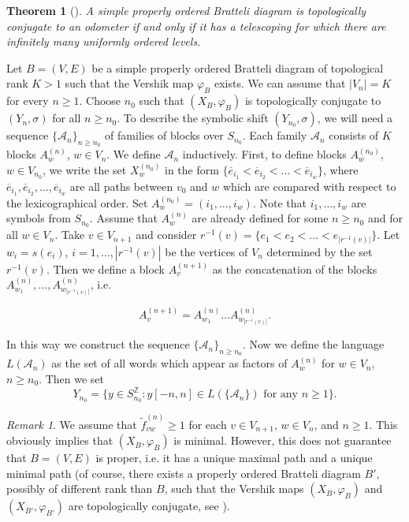 \documentclass[11pt, english, reqno]{amsart}
\theoremstyle{definition}
\theoremstyle{remark}
\newtheorem{remar}[defin]{Remark}
\theoremstyle{plain}
\newtheorem{thm}[defin]{Theorem}
\def\ov{\overline}
\def\tl{\widetilde}
\numberwithin{equation}{section}
\begin{document}
{\begin{thm}[\cite{FrickPetersenShields2017}]
A simple properly ordered Bratteli diagram is topologically conjugate to an
odometer if and only if it has a telescoping for which there are infinitely many
uniformly ordered levels.
\end{thm}

Let $B = (V,E)$ be a simple properly ordered Bratteli diagram of topological
rank $K > 1$ such that the Vershik map $\varphi_B$ exists. We can assume
that $|V_n| = K$ for every $n \geq 1$. Choose $n_0$ such that $(X_B,
\varphi_B)$ is topologically conjugate to $(Y_n, \sigma)$ for all $n \geq
n_0$. To describe the symbolic shift $(Y_{n_0}, \sigma)$, we will need a
sequence $\{\mathcal{A}_n\}_{n \geq n_0}$ of families of blocks over
$S_{n_0}$. Each family $\mathcal{A}_n$ consists of $K$ blocks
$A_w^{(n)}$, $w \in V_n$. We define $\mathcal{A}_n$ inductively. First, to
define blocks $A_w^{(n_0)}$, $w \in V_{n_0}$, we write the set
$X_w^{(n_0)}$ in the form $\{\ov e_{i_1} < \ov e_{i_2} < \ldots < \ov
e_{i_w}\}$, where $\ov e_{i_1}, \ov e_{i_2}, \ldots, \ov e_{i_w}$ are all
paths between $v_0$ and $w$ which are compared with respect to the
lexicographical order. Set $A_w^{(n_0)} = (i_1, \ldots, i_w)$. Note that
$i_1, \ldots, i_w$ are symbols from $S_{n_0}$. Assume that $A_w^{(n)}$
are already defined for some $n \geq n_0$ and for all $w \in V_n$. Take $v
\in V_{n+1}$ and consider $r^{-1}(v) = \{e_1 < e_2 < \ldots < e_{|r^{-1}
(v)|}\}$. Let $w_i = s(e_i)$, $i = 1, \ldots, |r^{-1}(v)|$ be the vertices of
$V_n$ determined by the set $r^{-1}(v)$. Then we define a block $A_v^{(n
+1)}$ as the concatenation of the blocks $A_{w_1}^{(n)}, \ldots, A_{w_{|
r^{-1}(v)|}}^{(n)}$, i.e.

\begin{equation}\label{blockAvn}
A_v^{(n+1)} = A_{w_1}^{(n)} \ldots A_{w_{|r^{-1}(v)|}}^{(n)}.
\end{equation}

In this way we construct the sequence $\{\mathcal{A}_n\}_{n \geq
n_0}$. Now we define the language $L(\mathcal{A}_n)$ as the set of all
words which appear as factors of $A_w^{(n)}$ for $w \in V_n$, $n \geq
n_0$. Then we set
$$
Y_{n_0} = \{y \in S_{n_0}^{\mathbb{Z}} : y[-n,n] \in L(\{\mathcal{A}_n\})
\mbox{ for any } n \geq 1\}.
$$

\begin{remar}
We assume that $\tl f_{vw}^{(n)} \geq 1$ for each $v \in V_{n+1}$, $w \in
V_n$, and $n \geq 1$. This obviously  implies that $(X_B, \varphi_B)$ is
 minimal.
However, this does not guarantee that $B = (V,E)$ is proper, i.e. it has a
unique maximal path and a unique minimal path (of course, there exists a
 properly ordered
Bratteli diagram $B'$, possibly of different rank than $B$,  such that the Vershik maps $(X_B, \varphi_B)$
and $(X_{B'}, \varphi_{B'})$ are topologically conjugate, 
see \cite{HermanPutnamSkau1992} ).
\end{remar}

}
\end{document}
